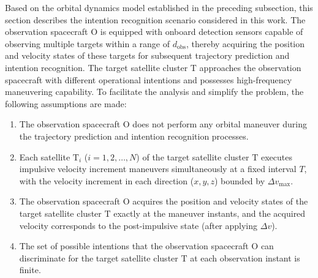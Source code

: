 \documentclass[a4paper,fleqn]{cas-dc}
\begin{document}
Based on the orbital dynamics model established in the preceding subsection, this section describes the intention recognition scenario considered in this work. The observation spacecraft $\mathrm{O}$ is equipped with onboard detection sensors capable of observing multiple targets within a range of $d_{\text{obs}}$, thereby acquiring the position and velocity states of these targets for subsequent trajectory prediction and intention recognition. The target satellite cluster $\mathrm{T}$ approaches the observation spacecraft with different operational intentions and possesses high-frequency maneuvering capability. To facilitate the analysis and simplify the problem, the following assumptions are made:

\begin{enumerate}[1.]
    \item The observation spacecraft $\mathrm{O}$ does not perform any orbital maneuver during the trajectory prediction and intention recognition processes.
    \item Each satellite $\mathrm{T}_i$ ($i=1,2,\ldots,N$) of the target satellite cluster $\mathrm{T}$ executes impulsive velocity increment maneuvers simultaneously at a fixed interval $T$, with the velocity increment in each direction ($x,y,z$) bounded by $\Delta v_{\max}$.
    \item The observation spacecraft $\mathrm{O}$ acquires the position and velocity states of the target satellite cluster $\mathrm{T}$ exactly at the maneuver instants, and the acquired velocity corresponds to the post-impulsive state (after applying $\Delta v$).
    \item The set of possible intentions that the observation spacecraft $\mathrm{O}$ can discriminate for the target satellite cluster $\mathrm{T}$ at each observation instant is finite.
\end{enumerate}
\end{document}
